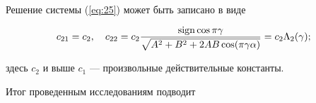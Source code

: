 Решение системы (\ref{eq:25}) может быть записано в виде


\begin{equation} 


c_{21}=c_2,\quad c_{22}=c_2\frac{\sign\cos\pi\gamma}


{\sqrt{A^2+B^2+2AB\cos(\pi\gamma\alpha)}}=c_2\Lambda_2(\gamma);


\label{eq:29}


\end{equation}


здесь $c_2$ и выше $c_1$ --- произвольные действительные константы.





Итог проведенным исследованиям подводит





